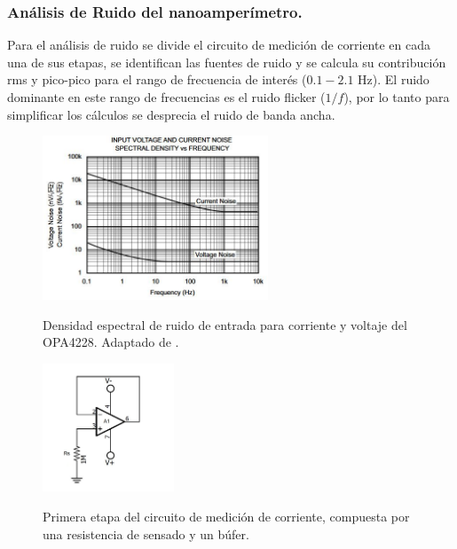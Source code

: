 \subsubsection{Análisis de Ruido del nanoamperímetro.}
Para el análisis de ruido se divide el circuito de medición de corriente en cada una de sus etapas, se identifican las fuentes de ruido y se calcula su contribución rms y pico-pico para el rango de frecuencia de interés ($0.1-2.1 $ Hz). El ruido dominante en este rango de frecuencias es el ruido flicker ($1/f$), por lo tanto para simplificar los cálculos se desprecia el ruido de banda ancha.
\begin{figure}[h!]
\begin{centering}

    \caption{Densidad espectral de ruido de entrada para corriente y voltaje del OPA4228. Adaptado de \citep{OPA_4228}. }
    \includegraphics[width=0.6\textwidth]{Images/Noise_opa.JPG}
    \label{fig:noise_espectral}
  \par\end{centering}
\end{figure}
\begin{figure}[h!]
\begin{centering}
    \caption{Primera etapa del circuito de medición de corriente, compuesta por una resistencia de sensado y un búfer. }
    \includegraphics[width=0.35\textwidth]{Images/ammeter_buffer.JPG}
    \label{fig:ammeter_buffer}
  \par\end{centering}
\end{figure}
